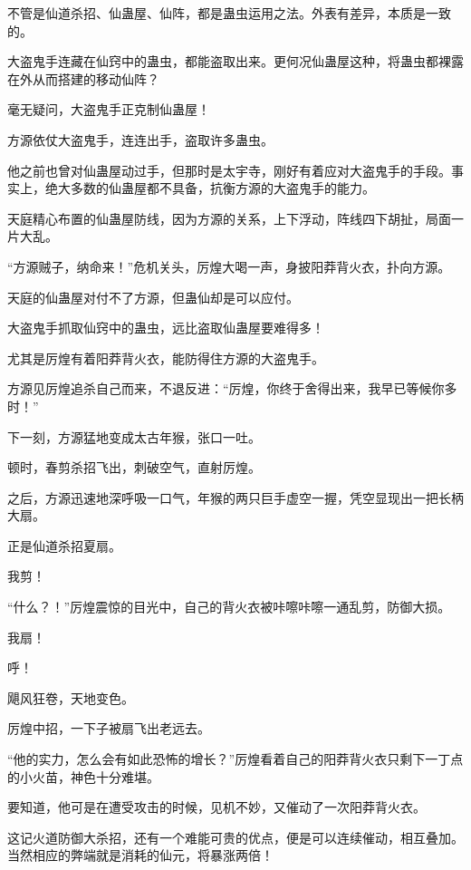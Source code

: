 \begin{this_body}
不管是仙道杀招、仙蛊屋、仙阵，都是蛊虫运用之法。外表有差异，本质是一致的。

大盗鬼手连藏在仙窍中的蛊虫，都能盗取出来。更何况仙蛊屋这种，将蛊虫都裸露在外从而搭建的移动仙阵？

毫无疑问，大盗鬼手正克制仙蛊屋！

方源依仗大盗鬼手，连连出手，盗取许多蛊虫。

他之前也曾对仙蛊屋动过手，但那时是太宇寺，刚好有着应对大盗鬼手的手段。事实上，绝大多数的仙蛊屋都不具备，抗衡方源的大盗鬼手的能力。

天庭精心布置的仙蛊屋防线，因为方源的关系，上下浮动，阵线四下胡扯，局面一片大乱。

“方源贼子，纳命来！”危机关头，厉煌大喝一声，身披阳莽背火衣，扑向方源。

天庭的仙蛊屋对付不了方源，但蛊仙却是可以应付。

大盗鬼手抓取仙窍中的蛊虫，远比盗取仙蛊屋要难得多！

尤其是厉煌有着阳莽背火衣，能防得住方源的大盗鬼手。

方源见厉煌追杀自己而来，不退反进：“厉煌，你终于舍得出来，我早已等候你多时！”

下一刻，方源猛地变成太古年猴，张口一吐。

顿时，春剪杀招飞出，刺破空气，直射厉煌。

之后，方源迅速地深呼吸一口气，年猴的两只巨手虚空一握，凭空显现出一把长柄大扇。

正是仙道杀招夏扇。

我剪！

“什么？！”厉煌震惊的目光中，自己的背火衣被咔嚓咔嚓一通乱剪，防御大损。

我扇！

呼！

飓风狂卷，天地变色。

厉煌中招，一下子被扇飞出老远去。

“他的实力，怎么会有如此恐怖的增长？”厉煌看着自己的阳莽背火衣只剩下一丁点的小火苗，神色十分难堪。

要知道，他可是在遭受攻击的时候，见机不妙，又催动了一次阳莽背火衣。

这记火道防御大杀招，还有一个难能可贵的优点，便是可以连续催动，相互叠加。当然相应的弊端就是消耗的仙元，将暴涨两倍！

\end{this_body}


